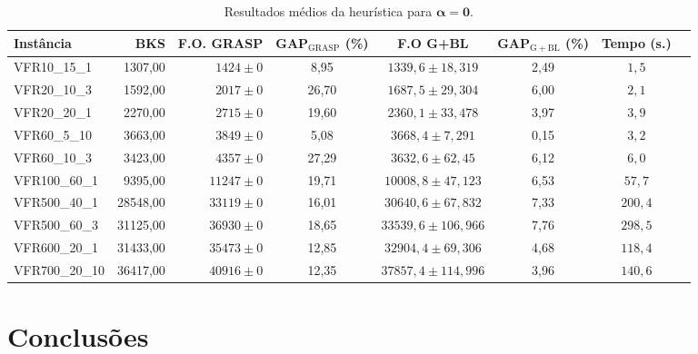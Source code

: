\documentclass[12pt]{article}
\begin{document}
\begin{table}[ht]
   \centering
   \scriptsize
   \begin{tabular}{lrrccccr}
   \toprule
   Instância & BKS & F.O. GRASP & GAP$_\mathrm{GRASP}$ (\%) & F.O G+BL & GAP$_\mathrm{G+BL}$ (\%) & Tempo (s.) \\ 
   \midrule
   VFR10\_15\_1 & 1307,00 & $1424 \pm 0$ & 8,95 & $1339,6 \pm 18,319$ & 2,49 & $1,5$ \\ 
   VFR20\_10\_3 & 1592,00 & $2017 \pm 0$ & 26,70 & $1687,5 \pm 29,304$ & 6,00 & $2,1$ \\ 
   VFR20\_20\_1 & 2270,00 & $2715 \pm 0$ & 19,60 & $2360,1 \pm 33,478$ & 3,97 & $3,9$ \\ 
   VFR60\_5\_10 & 3663,00 & $3849 \pm 0$ & 5,08 & $3668,4 \pm 7,291$ & 0,15 & $3,2$ \\ 
   VFR60\_10\_3 & 3423,00 & $4357 \pm 0$ & 27,29 & $3632,6 \pm 62,45$ & 6,12 &
   $6,0$ \\ 
   VFR100\_60\_1 & 9395,00  & $11247 \pm 0$ & 19,71 & $10008,8 \pm 47,123$ & 6,53 & $57,7$ \\ 
   VFR500\_40\_1 & 28548,00 & $33119 \pm 0$ & 16,01 & $30640,6 \pm 67,832$ & 7,33 & $200,4$ \\ 
   VFR500\_60\_3 & 31125,00 & $36930 \pm 0$ & 18,65 & $33539,6 \pm 106,966$ & 7,76 & $298,5$ \\ 
   VFR600\_20\_1 & 31433,00 & $35473 \pm 0$ & 12,85 & $32904,4 \pm 69,306$ & 4,68 & $118,4$ \\ 
   VFR700\_20\_10 & 36417,00 & $40916 \pm 0$ & 12,35 & $37857,4 \pm 114,996$ & 3,96 & $140,6$ \\ 
   \bottomrule
   \end{tabular}
   \caption{Resultados médios da heurística para $\bm{\alpha = 0}$.} 
   \label{table:results-heur-short}
\end{table}

\section{Conclusões}
\end{document}
